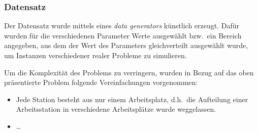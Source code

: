 
\subsubsection*{Datensatz}\label{subsubsec:datensatz-sequencer}
Der Datensatz wurde mittels eines \textit{data generators} künstlich erzeugt.
Dafür wurden für die verschiedenen Parameter Werte ausgewählt bzw.\ ein Bereich angegeben, aus dem der
Wert des Parameters gleichverteilt ausgewählt wurde, um Instanzen verschiedener realer Probleme zu simulieren.

Um die Komplexität des Problems zu verringern, wurden in Bezug auf das oben präsentierte Problem folgende
Vereinfachungen vorgenommen:
\begin{itemize}
    \item Jede Station besteht aus nur einem Arbeitsplatz,
    d.h.\ die Aufteilung einer Arbeitsstation in verschiedene Arbeitsplätze wurde weggelassen.
    \item \dots
\end{itemize}
